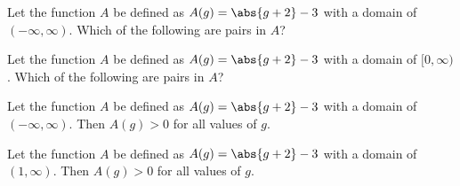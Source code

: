 \documentclass{ximera}
\begin{document}
\begin{exercise}
Let the function $A$ be defined as $A(g) = \abs{g+2}-3$ with a domain of $(-\infty, \infty)$. Which of the following are pairs in $A$?

\begin{selectAll}
\end{selectAll}

\end{exercise}





\begin{exercise}
Let the function $A$ be defined as $A(g) = \abs{g+2}-3$ with a domain of $[0, \infty)$. Which of the following are pairs in $A$?

\begin{selectAll}
\end{selectAll}

\end{exercise}






\begin{exercise}
Let the function $A$ be defined as $A(g) = \abs{g+2}-3$ with a domain of $(-\infty, \infty)$. Then $A(g) > 0$ for all values of $g$.



\begin{multipleChoice}
\end{multipleChoice}

\end{exercise}




\begin{exercise}
Let the function $A$ be defined as $A(g) = \abs{g+2}-3$ with a domain of $(1, \infty)$. Then $A(g) > 0$ for all values of $g$.



\begin{multipleChoice}
\end{multipleChoice}

\end{exercise}
\end{document}
